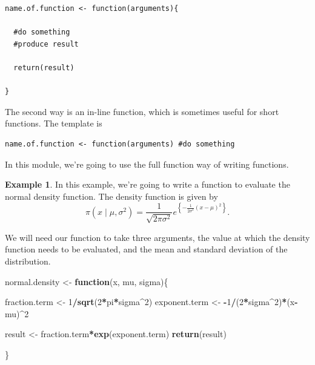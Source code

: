 \documentclass[
]{book}
\newenvironment{Shaded}{\begin{snugshade}}{\end{snugshade}}
\newcommand{\ControlFlowTok}[1]{\textcolor[rgb]{0.13,0.29,0.53}{\textbf{#1}}}
\newcommand{\DecValTok}[1]{\textcolor[rgb]{0.00,0.00,0.81}{#1}}
\newcommand{\FunctionTok}[1]{\textcolor[rgb]{0.13,0.29,0.53}{\textbf{#1}}}
\newcommand{\NormalTok}[1]{#1}
\newcommand{\OtherTok}[1]{\textcolor[rgb]{0.56,0.35,0.01}{#1}}
\newcommand{\SpecialCharTok}[1]{\textcolor[rgb]{0.81,0.36,0.00}{\textbf{#1}}}
\theoremstyle{definition}
\theoremstyle{definition}
\newtheorem{example}{Example}[chapter]
\theoremstyle{definition}
\theoremstyle{definition}
\theoremstyle{remark}
\begin{document}
\begin{verbatim}
name.of.function <- function(arguments){

  #do something
  #produce result
  
  return(result)

}
\end{verbatim}

The second way is an in-line function, which is sometimes useful for short functions. The template is

\begin{verbatim}
name.of.function <- function(arguments) #do something
\end{verbatim}

In this module, we're going to use the full function way of writing functions.

\begin{example}
In this example, we're going to write a function to evaluate the normal density function. The density function is given by
\[
\pi(x \mid \mu, \sigma^2) = \frac{1}{\sqrt{2\pi\sigma^2}}e^{\left\{-\frac{1}{2\sigma^2}(x-\mu)^2\right\}}.
\]

We will need our function to take three arguments, the value at which the density function needs to be evaluated, and the mean and standard deviation of the distribution.

\begin{Shaded}
\begin{Highlighting}[]
\NormalTok{normal.density }\OtherTok{\textless{}{-}} \ControlFlowTok{function}\NormalTok{(x, mu, sigma)\{}
  
\NormalTok{  fraction.term }\OtherTok{\textless{}{-}} \DecValTok{1}\SpecialCharTok{/}\FunctionTok{sqrt}\NormalTok{(}\DecValTok{2}\SpecialCharTok{*}\NormalTok{pi}\SpecialCharTok{*}\NormalTok{sigma}\SpecialCharTok{\^{}}\DecValTok{2}\NormalTok{)}
\NormalTok{  exponent.term }\OtherTok{\textless{}{-}} \SpecialCharTok{{-}}\DecValTok{1}\SpecialCharTok{/}\NormalTok{(}\DecValTok{2}\SpecialCharTok{*}\NormalTok{sigma}\SpecialCharTok{\^{}}\DecValTok{2}\NormalTok{)}\SpecialCharTok{*}\NormalTok{(x}\SpecialCharTok{{-}}\NormalTok{mu)}\SpecialCharTok{\^{}}\DecValTok{2}
  
\NormalTok{  result }\OtherTok{\textless{}{-}}\NormalTok{ fraction.term}\SpecialCharTok{*}\FunctionTok{exp}\NormalTok{(exponent.term)}
  \FunctionTok{return}\NormalTok{(result)}
  
\NormalTok{\}}
\end{Highlighting}
\end{Shaded}


\end{example}
\end{document}
